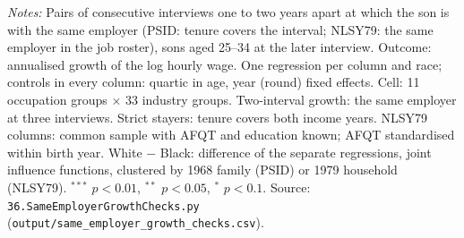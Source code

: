 \begin{table}[!htbp]
\begin{minipage}{\textwidth}\footnotesize \textit{Notes:} Pairs of consecutive interviews one to two years apart at which the son is with the same employer (PSID: tenure covers the interval; NLSY79: the same employer in the job roster), sons aged 25--34 at the later interview. Outcome: annualised growth of the log hourly wage. One regression per column and race; controls in every column: quartic in age, year (round) fixed effects. Cell: 11 occupation groups $\times$ 33 industry groups. Two-interval growth: the same employer at three interviews. Strict stayers: tenure covers both income years. NLSY79 columns: common sample with AFQT and education known; AFQT standardised within birth year. White $-$ Black: difference of the separate regressions, joint influence functions, clustered by 1968 family (PSID) or 1979 household (NLSY79). $^{***}$ $p<0.01$, $^{**}$ $p<0.05$, $^{*}$ $p<0.1$. Source: \texttt{36.SameEmployerGrowthChecks.py} (\texttt{output/same\_employer\_growth\_checks.csv}).\end{minipage}
\end{table}

